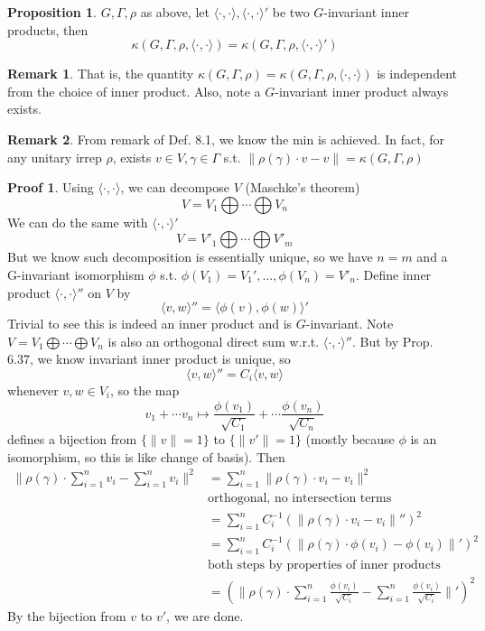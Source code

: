 \documentclass{book}
\newcommand{\inner}[1]{\langle #1 \rangle}
\newcommand{\norm}[1]{\lVert #1 \rVert}
\theoremstyle{definition}
\newtheorem{proposition}[lemma]{Proposition}
\theoremstyle{remarkstyle}
\newtheorem*{remark}{Remark}%
\newtheorem*{myproof}{Proof}%
\begin{document}
\begin{proposition}
    $G,\Gamma,\rho$ as above, let $\inner{\cdot,\cdot}, \inner{\cdot,\cdot}'$ be two $G$-invariant inner products, then 
    $$
    \kappa (G,\Gamma,\rho,\inner{\cdot,\cdot}) = \kappa (G,\Gamma,\rho,\inner{\cdot,\cdot}') 
    $$
\end{proposition}
\begin{remark}
    That is, the quantity $\kappa (G,\Gamma,\rho) = \kappa (G,\Gamma,\rho,\inner{\cdot,\cdot})$ is independent from the choice of inner product. Also, note a $G$-invariant inner product always exists. 
\end{remark}
\begin{remark}
    From remark of Def. 8.1, we know the min is achieved. In fact, for any unitary irrep $\rho$, exists $v\in V,\gamma\in\Gamma$ s.t. $\norm{\rho(\gamma)\cdot v-v}=\kappa(G,\Gamma,\rho)$
\end{remark}
\begin{myproof}
    Using $\inner{\cdot,\cdot}$, we can decompose $V$ (Maschke's theorem)
    $$
    V = V_1 \bigoplus \cdots \bigoplus V_n
    $$
    We can do the same with $\inner{\cdot,\cdot}'$
    $$
    V = V'_1 \bigoplus \cdots \bigoplus V'_m
    $$
    But we know such decomposition is essentially unique, so we have $n=m$ and a G-invariant isomorphism $\phi$ s.t. $\phi(V_1)=V_1',\dots, \phi(V_n)=V'_n$. Define inner product $\inner{\cdot,\cdot}''$ on $V$ by 
    $$
    \inner{v,w}'' = \inner{\phi(v),\phi(w)}'
    $$
    Trivial to see this is indeed an inner product and is $G$-invariant. Note $V = V_1 \bigoplus \cdots \bigoplus V_n$ is also an orthogonal direct sum w.r.t. $\inner{\cdot,\cdot}''$. But by Prop. 6.37, we know invariant inner product is unique, so 
    $$
    \inner{v,w}'' = C_i\inner{v,w}
    $$
    whenever $v,w\in V_i$, so the map 
    $$
    v_1 + \cdots v_n \mapsto \frac{\phi(v_1)}{\sqrt{C_1}} + \cdots \frac{\phi(v_n)}{\sqrt{C_n}}
    $$
    defines a bijection from $\{\norm{v}=1\}$ to $\{\norm{v'}=1\}$ (mostly because $\phi$ is an isomorphism, so this is like change of basis). Then
    \begin{align*}
        \norm{\rho(\gamma)\cdot \sum^n_{i=1}v_i-\sum^n_{i=1}v_i}^2 
        &= \sum^n_{i=1}\norm{\rho(\gamma)\cdot v_i - v_i}^2 \\
        &\textrm{orthogonal, no intersection terms} \\
        &= \sum^n_{i=1}C^{-1}_i (\norm{\rho(\gamma)\cdot v_i - v_i}'')^2 \\
        &= \sum^n_{i=1}C^{-1}_i(\norm{\rho(\gamma)\cdot\phi(v_i)-\phi(v_i)}')^2 \\
        &\textrm{both steps by properties of inner products} \\
        &= (\norm{\rho(\gamma)\cdot \sum^n_{i=1}\frac{\phi(v_i)}{\sqrt{C_i}} - \sum^n_{i=1}\frac{\phi(v_i)}{\sqrt{C_i}} }')^2
    \end{align*}
    By the bijection from $v$ to $v'$, we are done. \newline 
\end{myproof}
\end{document}
